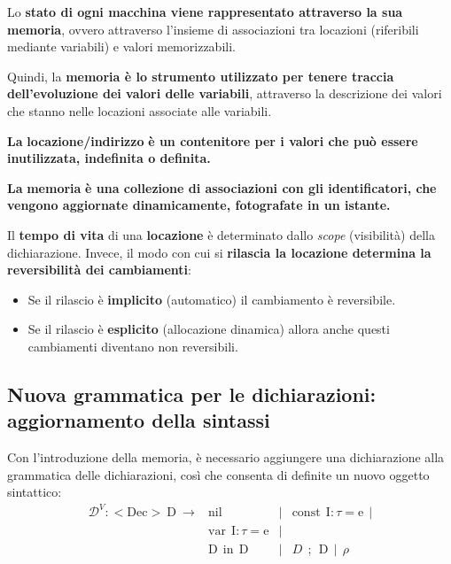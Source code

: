 \documentclass[a4paper]{article}
\begin{document}
	\noindent
	Lo \textbf{stato di ogni macchina viene rappresentato attraverso la sua memoria}, ovvero attraverso l'insieme di associazioni tra locazioni (riferibili mediante variabili) e valori memorizzabili.
	
	Quindi, la \textbf{memoria è lo strumento utilizzato per tenere traccia dell'evoluzione dei valori delle variabili}, attraverso la descrizione dei valori che stanno nelle locazioni associate alle variabili.\:\newline
	
	\noindent	
	\begin{boxdef}
		\textbf{La} \textcolor{Red3}{\textbf{locazione/indirizzo}} \textbf{è un contenitore per i valori che può essere inutilizzata, indefinita o definita.}
	\end{boxdef}\:\newline
	
	\noindent
	\begin{boxdef}
		\textbf{La} \textcolor{Red3}{\textbf{memoria}} \textbf{è una collezione di associazioni con gli identificatori, che vengono aggiornate dinamicamente, fotografate in un istante.}
	\end{boxdef}\:\newline

	\noindent
	Il \textbf{tempo di vita} di una \textbf{locazione} è determinato dallo \emph{scope} (visibilità) della dichiarazione. Invece, il modo con cui si \textbf{rilascia la locazione determina la reversibilità dei cambiamenti}:
	\begin{itemize}
		\item Se il rilascio è \textbf{implicito} (automatico) il cambiamento è reversibile.
		
		\item Se il rilascio è \textbf{esplicito} (allocazione dinamica) allora anche questi cambiamenti diventano non reversibili.
	\end{itemize}\newpage

	\subsection{Nuova grammatica per le dichiarazioni: aggiornamento della sintassi}
	
	Con l'introduzione della memoria, è necessario aggiungere una dichiarazione alla grammatica delle dichiarazioni, così che consenta di definite un nuovo oggetto sintattico:
	\begin{equation*}
		\begin{array}{rrll}
			\mathcal{D}^{V}: \mathrm{<Dec>} \: \mathrm{D} \: \rightarrow & \mathrm{nil} & | & \mathrm{const} \:\: \mathrm{I}:\tau = \mathrm{e} \:\: | \\
			& \mathrm{var} \:\: \mathrm{I}:\tau = \mathrm{e} & | & \\
			& \mathrm{D} \:\: \mathrm{in} \:\: \mathrm{D} & | & D \:\: ; \:\: \mathrm{D} \:\: | \:\: \rho
		\end{array}
	\end{equation*}
\end{document}
